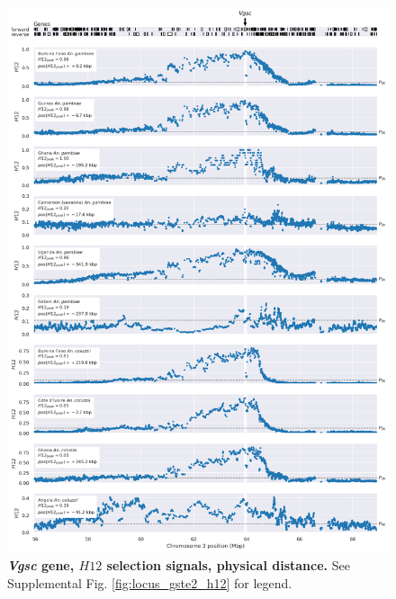 \documentclass[a4paper,11pt,abstracton,hidelinks]{scrartcl}
\begin{document}
\begin{figure}[t!]
	\begin{center}
		\includegraphics*[width=1\linewidth,center]{artwork/locus_vgsc_h12_pdist.png}
	\end{center}
	\caption[\textit{Vgsc} gene, $H12$ selection signals, physical distance]{
	\textbf{\textit{Vgsc} gene, $H12$ selection signals, physical distance.}
	See Supplemental Fig. \ref{fig:locus_gste2_h12} for legend.
	} 
	\label{fig:locus_vgsc_h12_pdist}
\end{figure}


\clearpage
\end{document}
